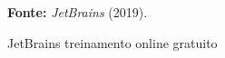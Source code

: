 \begin{figure}[h!]
\centering

\caption{\textmd{JetBrains treinamento online gratuito}}
\label{fig:onlinetraining}

\par\medskip\textbf{Fonte:} \textit{JetBrains} (2019). \par\medskip
\end{figure}
